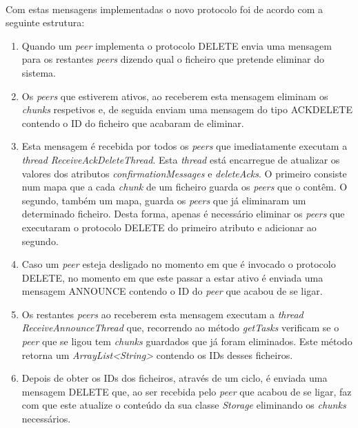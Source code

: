 \documentclass[11pt,oneside]{book}
\begin{document}
\paragraph{}
    Com estas mensagens implementadas o novo protocolo foi de acordo com a seguinte estrutura:
    \begin{enumerate}
        \item Quando um \textit{peer} implementa o protocolo DELETE envia uma mensagem para 
        os restantes \textit{peers} dizendo qual o ficheiro que pretende eliminar do sistema.
        \item Os \textit{peers} que estiverem ativos, ao receberem esta mensagem eliminam os
        \textit{chunks} respetivos e, de seguida enviam uma mensagem do tipo ACKDELETE contendo
        o ID do ficheiro que acabaram de eliminar. 
        \item Esta mensagem é recebida por todos os \textit{peers} que imediatamente executam a
        \textit{thread ReceiveAckDeleteThread}. Esta \textit{thread} está encarregue de 
        atualizar os valores dos atributos \textit{confirmationMessages} e \textit{deleteAcks}. 
        O primeiro consiste num mapa que a cada \textit{chunk} de um ficheiro guarda os 
        \textit{peers} que o contêm. O segundo, também um mapa, guarda os \textit{peers} que já 
        eliminaram um determinado ficheiro. Desta forma, apenas é necessário eliminar os 
        \textit{peers} que executaram o protocolo DELETE do primeiro atributo e adicionar ao 
        segundo.
        \item Caso um \textit{peer} esteja desligado no momento em que é invocado o protocolo
        DELETE, no momento em que este passar a estar ativo é enviada uma mensagem ANNOUNCE 
        contendo o ID do \textit{peer} que acabou de se ligar.
        \item Os restantes \textit{peers} ao receberem esta mensagem executam a 
        \textit{thread ReceiveAnnounceThread} que, recorrendo ao método \textit{getTasks} 
        verificam se o \textit{peer} que se ligou tem \textit{chunks} guardados que já foram
        eliminados. Este método retorna um \textit{ArrayList\textless String\textgreater} 
        contendo os IDs desses ficheiros.
        \item Depois de obter os IDs dos ficheiros, através de um ciclo, é enviada uma 
        mensagem DELETE que, ao ser recebida pelo \textit{peer} que acabou de se ligar, faz 
        com que este atualize o conteúdo da sua classe \textit{Storage} eliminando os 
        \textit{chunks} necessários.
    \end{enumerate}
\end{document}
